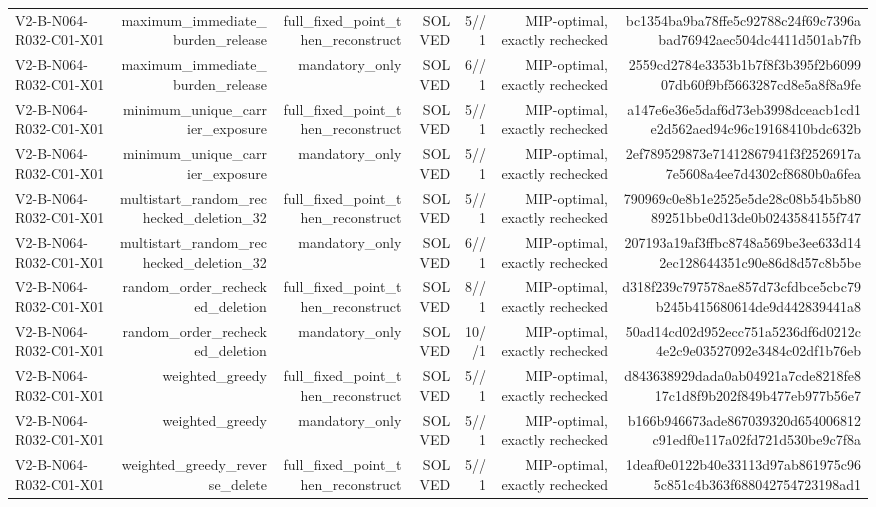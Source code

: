 {\begin{longtable}{lrrrrrr}
V2-B-N064-R032-C01-X01 & maximum\_immediate\_burden\_release & full\_fixed\_point\_then\_reconstruct & SOLVED & 5//1 & MIP-optimal, exactly rechecked & bc1354ba9ba78ffe5c92788c24f69c7396abad76942aec504dc4411d501ab7fb \\
V2-B-N064-R032-C01-X01 & maximum\_immediate\_burden\_release & mandatory\_only & SOLVED & 6//1 & MIP-optimal, exactly rechecked & 2559cd2784e3353b1b7f8f3b395f2b609907db60f9bf5663287cd8e5a8f8a9fe \\
V2-B-N064-R032-C01-X01 & minimum\_unique\_carrier\_exposure & full\_fixed\_point\_then\_reconstruct & SOLVED & 5//1 & MIP-optimal, exactly rechecked & a147e6e36e5daf6d73eb3998dceacb1cd1e2d562aed94c96c19168410bdc632b \\
V2-B-N064-R032-C01-X01 & minimum\_unique\_carrier\_exposure & mandatory\_only & SOLVED & 5//1 & MIP-optimal, exactly rechecked & 2ef789529873e71412867941f3f2526917a7e5608a4ee7d4302cf8680b0a6fea \\
V2-B-N064-R032-C01-X01 & multistart\_random\_rechecked\_deletion\_32 & full\_fixed\_point\_then\_reconstruct & SOLVED & 5//1 & MIP-optimal, exactly rechecked & 790969c0e8b1e2525e5de28c08b54b5b8089251bbe0d13de0b0243584155f747 \\
V2-B-N064-R032-C01-X01 & multistart\_random\_rechecked\_deletion\_32 & mandatory\_only & SOLVED & 6//1 & MIP-optimal, exactly rechecked & 207193a19af3ffbc8748a569be3ee633d142ec128644351c90e86d8d57c8b5be \\
V2-B-N064-R032-C01-X01 & random\_order\_rechecked\_deletion & full\_fixed\_point\_then\_reconstruct & SOLVED & 8//1 & MIP-optimal, exactly rechecked & d318f239c797578ae857d73cfdbce5cbc79b245b415680614de9d442839441a8 \\
V2-B-N064-R032-C01-X01 & random\_order\_rechecked\_deletion & mandatory\_only & SOLVED & 10//1 & MIP-optimal, exactly rechecked & 50ad14cd02d952ecc751a5236df6d0212c4e2c9e03527092e3484c02df1b76eb \\
V2-B-N064-R032-C01-X01 & weighted\_greedy & full\_fixed\_point\_then\_reconstruct & SOLVED & 5//1 & MIP-optimal, exactly rechecked & d843638929dada0ab04921a7cde8218fe817c1d8f9b202f849b477eb977b56e7 \\
V2-B-N064-R032-C01-X01 & weighted\_greedy & mandatory\_only & SOLVED & 5//1 & MIP-optimal, exactly rechecked & b166b946673ade867039320d654006812c91edf0e117a02fd721d530be9c7f8a \\
V2-B-N064-R032-C01-X01 & weighted\_greedy\_reverse\_delete & full\_fixed\_point\_then\_reconstruct & SOLVED & 5//1 & MIP-optimal, exactly rechecked & 1deaf0e0122b40e33113d97ab861975c965c851c4b363f688042754723198ad1 \\

\end{longtable}}
